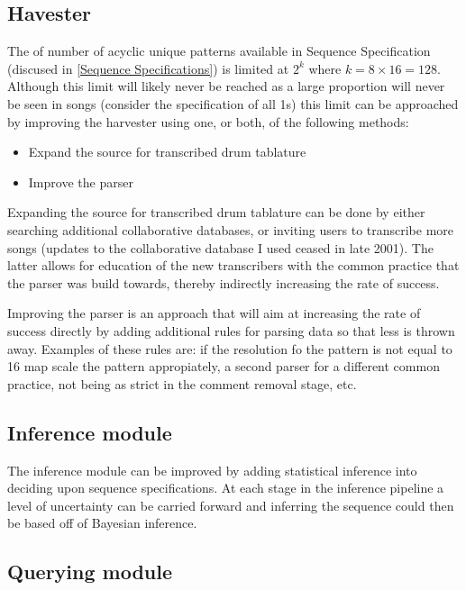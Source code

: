 \documentclass[12pt,twoside,notitlepage]{report}
\begin{document}
	\subsection{Havester}
					The of number of acyclic unique patterns available in Sequence Specification (discused in \ref{Sequence Specifications}) is limited at $2^k$ where $k = 8\times 16 = 128$. Although this limit will likely never be reached as a large proportion will never be seen in songs (consider the specification of all 1s) this limit can be approached by improving the harvester using one, or both, of the following methods:
					\begin{itemize}
				\item{Expand the source for transcribed drum tablature}
				\item{Improve the parser}		
\end{itemize}					 
					Expanding the source for transcribed drum tablature can be done by either searching additional collaborative databases, or inviting users to transcribe more songs (updates to the collaborative database I used ceased in late 2001). The latter allows for education of the new transcribers with the common practice that the parser was build towards, thereby indirectly increasing the rate of success.
					
					Improving the parser is an approach that will aim at increasing the rate of success directly by adding additional rules for parsing data so that less is thrown away. Examples of these rules are: if the resolution fo the pattern is not equal to 16 map scale the pattern appropiately, a second parser for a different common practice, not being as strict in the comment removal stage, etc.
					
						
		\subsection{Inference module}
		The inference module can be improved by adding statistical inference into deciding upon sequence specifications. At each stage in the inference pipeline a level of uncertainty can be carried forward and inferring the sequence could then be based off of Bayesian inference.
		
			\subsection{Querying module}
		
\end{document}
